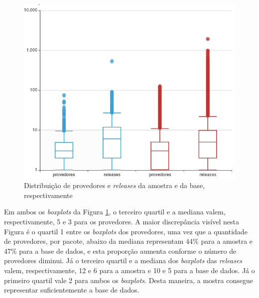 \begin{figure}
    \centering
    \includegraphics[scale=0.6]{figuras/data_box_plot_pt.png}
    \caption{Distribuição de provedores e \textit{releases} da amostra e da base, respectivamente}
    \label{fig:database}
\end{figure}{}

Em ambos os \textit{boxplots} da Figura \ref{fig:database}, o terceiro quartil e a mediana valem, respectivamente, 5 e 3 para os provedores. A maior discrepância visível nesta Figura é o quartil 1 entre os \textit{boxplots} dos provedores, uma vez que a quantidade de provedores, por pacote, abaixo da mediana representam 44\% para a amostra e 47\% para a base de dados, e esta proporção aumenta conforme o número de provedores diminui. Já o terceiro quartil e a mediana dos \textit{boxplots} das \textit{releases} valem, respectivamente, 12 e 6 para a amostra e 10 e 5 para a base de dados. Já o primeiro quartil vale 2 para ambos os \textit{boxplots}. Desta maneira, a mostra consegue representar suficientemente a base de dados.
